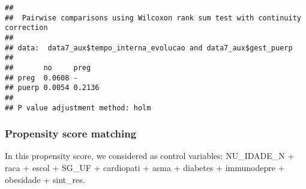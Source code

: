 \documentclass[
]{article}
\newenvironment{Shaded}{\begin{snugshade}}{\end{snugshade}}
\newcommand{\DataTypeTok}[1]{\textcolor[rgb]{0.13,0.29,0.53}{#1}}
\newcommand{\KeywordTok}[1]{\textcolor[rgb]{0.13,0.29,0.53}{\textbf{#1}}}
\newcommand{\NormalTok}[1]{#1}
\newcommand{\OperatorTok}[1]{\textcolor[rgb]{0.81,0.36,0.00}{\textbf{#1}}}
\newcommand{\OtherTok}[1]{\textcolor[rgb]{0.56,0.35,0.01}{#1}}
\newcommand{\StringTok}[1]{\textcolor[rgb]{0.31,0.60,0.02}{#1}}
\begin{document}
\begin{Shaded}
\end{Shaded}

\begin{verbatim}
## 
##  Pairwise comparisons using Wilcoxon rank sum test with continuity correction 
## 
## data:  data7_aux$tempo_interna_evolucao and data7_aux$gest_puerp 
## 
##       no     preg  
## preg  0.0608 -     
## puerp 0.0054 0.2136
## 
## P value adjustment method: holm
\end{verbatim}

\hypertarget{propensity-score-matching-1}{%
\subsubsection{Propensity score
matching}\label{propensity-score-matching-1}}

In this propensity score, we considered as control variables:
NU\_IDADE\_N + raca + escol + SG\_UF + cardiopati + asma + diabetes +
immunodepre + obesidade + sint\_res.

\begin{Shaded}
\end{Shaded}
\end{document}
